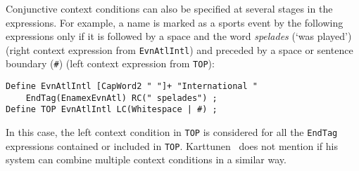 \documentclass{llncs}
\begin{document}


Conjunctive context conditions can also be specified at several stages in the
expressions. For example, a name is marked as a sports event by the
following expressions only if it is followed by a space and the word
\textit{spelades} (`was played') (right context expression from
\texttt{EvnAtlIntl}) and preceded by a space or sentence boundary
(\texttt{\#}) (left context expression from \texttt{TOP}):

\begin{verbatim}
Define EvnAtlIntl [CapWord2 " "]+ "International "
    EndTag(EnamexEvnAtl) RC(" spelades") ;
Define TOP EvnAtlIntl LC(Whitespace | #) ;
\end{verbatim}

\noindent
In this case, the left context condition in \texttt{TOP} is considered
for all the \texttt{EndTag} expressions contained or included in
\texttt{TOP}. Karttunen~\cite{karttunen/2011} does not mention if his
system can combine multiple context conditions in a similar way.


\end{document}
